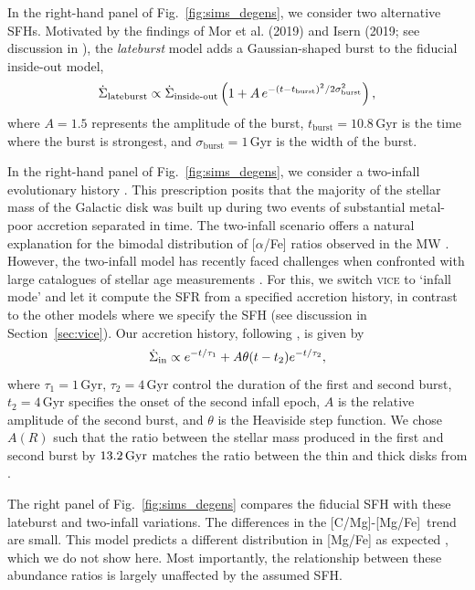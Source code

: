 \documentclass[fleqn,
usenatbib]{mnras}
\newcommand{\JJ}{\citetalias{james+21}}
\newcommand{\VICE}{\textsc{vice}}
\newcommand{\caafe}{[C/Mg]-[Mg/Fe]}
\begin{document}
{In the right-hand panel of Fig.~\ref{fig:sims_degens}, we consider two alternative SFHs.
Motivated by the findings of Mor et al. (2019) and Isern (2019; see discussion in \JJ), the \textit{lateburst} model adds a Gaussian-shaped burst to the fiducial inside-out model, 
\begin{equation}\label{eq:lateburst}
    \dot{\Sigma}_\text{lateburst} \propto \dot{\Sigma}_\text{inside-out} \left(1 + A\,e^{-(t-t_{\rm burst})^2/2\sigma^2_{\rm burst}} \right),
\end{equation}
where $A=1.5$ represents the amplitude of the burst, $t_\text{burst}=10.8$\,Gyr is the time where the burst is strongest, and $\sigma_\text{burst}=1$\,Gyr is the width of the burst.


In the right-hand panel of Fig.~\ref{fig:sims_degens}, we consider a two-infall evolutionary history \citep[e.g.,][]{chiappini+97,spitoni19, spitoni21, spitoni+23}. This prescription posits that the majority of the stellar mass of the Galactic disk was built up during two events of substantial metal-poor accretion separated in time. The two-infall scenario offers a natural explanation \citep{spitoni19, spitoni21} for the bimodal distribution of [$\alpha$/Fe] ratios observed in the MW \citep[e.g.,][]{hayden+15}. However, the two-infall model has recently faced challenges when confronted with large catalogues of stellar age measurements \citep{dubay+25}. 
For this, we switch \VICE{} to `infall mode' and let it compute the SFR from a specified accretion history, in contrast to the other models where we specify the SFH (see discussion in Section~\ref{sec:vice}). Our accretion history, following \citet{dubay+24}, is given by
\begin{equation}\label{eq:twoinfall}
\dot{\Sigma}_{\rm in} \propto e^{-t/\tau_1} + A \theta(t - t_{2}) e^{-t/\tau_2},
\end{equation}
where $\tau_1=1\,$Gyr, $\tau_2=4\,$Gyr control the duration of the first and second burst, $t_2=4$\,Gyr specifies the onset of the second infall epoch, $A$ is the relative amplitude of the second burst, and $\theta$ is the Heaviside step function. We chose $A(R)$ such that the ratio between the stellar mass produced in the first and second burst by $13.2\,{\rm Gyr}$ matches the ratio between the thin and thick disks from \citet{BHG16}.

The right panel of Fig.~\ref{fig:sims_degens} compares the fiducial SFH with these lateburst and two-infall variations. The differences in the \caafe\ trend are small. This model predicts a different distribution in [Mg/Fe] as expected \citep[e.g.,][]{JW20}, which we do not show here.
Most importantly, the relationship between these abundance ratios is largely unaffected by the assumed SFH. 


}
\end{document}
